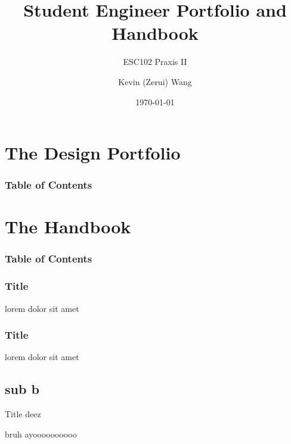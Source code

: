 \documentclass[aspectratio=1610]{beamer}
\title{Student Engineer Portfolio and Handbook}
\subtitle{ESC102 Praxis II}
\author{Kevin (Zerui) Wang}
\institute{University of Toronto}
\date{\today}
\begin{document}
\begin{frame}
\titlepage
\end{frame}

\section{The Design Portfolio}

\begin{frame}
    \frametitle{Table of Contents}
\end{frame}

\section{The Handbook}

\begin{frame}
    \frametitle{Table of Contents}
\end{frame}

\begin{frame}
    \frametitle{Title}
    lorem dolor sit amet
\end{frame}

\begin{frame}
    \frametitle{Title}
    lorem dolor sit amet
\end{frame}

\subsection{sub b}

\begin{frame}{Title deez}

\end{frame}

\begin{frame}{b}{ruh}
    ayoooooooooo

\end{frame}
\end{document}
